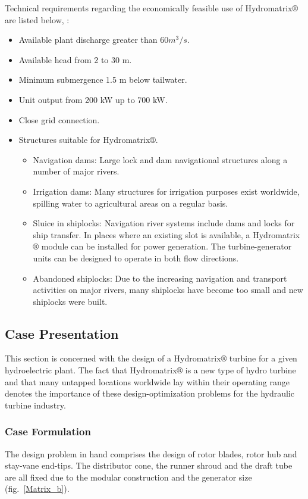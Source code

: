 Technical requirements regarding the economically feasible use of Hydromatrix$\circledR$ are listed below, \cite{matrix,matrix_2}: 
\begin{itemize}
\item Available plant discharge greater than $60 m^3/s$. 
\item Available head from 2 to 30 m. 
\item Minimum submergence 1.5 m below tailwater.
\item Unit output from 200 kW up to 700 kW.
\item Close grid connection.
\item Structures suitable for Hydromatrix$\circledR$. 
\begin{itemize}
	\item Navigation dams: Large lock and dam navigational structures along a number of major rivers. 
	\item Irrigation dams: Many structures for irrigation purposes exist worldwide, spilling water to agricultural areas on a regular basis.
	\item Sluice in shiplocks: Navigation river systems include dams and locks for ship transfer. In places where an existing slot is available, a Hydromatrix$\circledR$ module can be installed for power generation. The turbine-generator units can be designed to operate in both flow directions. 
	\item Abandoned shiplocks: Due to the increasing navigation and transport activities on major rivers, many shiplocks have become too small and new shiplocks were built.
\end{itemize}
\end{itemize}

\subsection{Case Presentation}
This section is concerned with the design of a  Hydromatrix$\circledR$ turbine for a given hydroelectric plant. The fact that Hydromatrix$\circledR$ is a new type of hydro turbine and that many untapped locations worldwide lay within their operating range denotes the importance of these design-optimization problems for the hydraulic turbine industry.    


\subsubsection{Case Formulation}
The design problem in hand comprises the design of rotor blades, rotor hub and stay-vane end-tips. The distributor cone, the runner shroud and the draft tube are all fixed due to the modular construction and the generator size (fig.\ \ref{Matrix_b}).     


